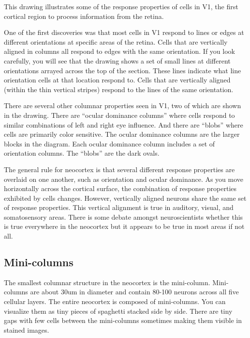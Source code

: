 \documentclass{report}
\begin{document}
This drawing illustrates some of the response properties of cells in
V1, the first cortical region to process information from the retina.

One of the first discoveries was that most cells in V1 respond to
lines or edges at different orientations at specific areas of the
retina. Cells that are vertically aligned in columns all respond to
edges with the same orientation. If you look carefully, you will see
that the drawing shows a set of small lines at different orientations
arrayed across the top of the section. These lines indicate what line
orientation cells at that location respond to. Cells that are
vertically aligned (within the thin vertical stripes) respond to the
lines of the same orientation.

There are several other columnar properties seen in V1, two of which
are shown in the drawing. There are ``ocular dominance columns'' where
cells respond to similar combinations of left and right eye
influence. And there are ``blobs'' where cells are primarily color
sensitive. The ocular dominance columns are the larger blocks in the
diagram. Each ocular dominance column includes a set of orientation
columns. The ``blobs'' are the dark ovals.

The general rule for neocortex is that several different response
properties are overlaid on one another, such as orientation and ocular
dominance. As you move horizontally across the cortical surface, the
combination of response properties exhibited by cells
changes. However, vertically aligned neurons share the same set of
response properties. This vertical alignment is true in auditory,
visual, and somatosensory areas. There is some debate amongst
neuroscientists whether this is true everywhere in the neocortex but
it appears to be true in most areas if not all.

\subsection*{Mini-columns}
The smallest columnar structure in the neocortex is the
mini-column. Mini-columns are about 30um in diameter and contain
80-100 neurons across all five cellular layers. The entire neocortex
is composed of mini-columns. You can visualize them as tiny pieces of
spaghetti stacked side by side. There are tiny gaps with few cells
between the mini-columns sometimes making them visible in stained
images.

\begin{figure}
\end{figure}
\end{document}
